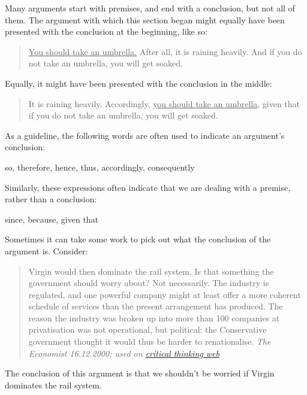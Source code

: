 Many arguments start with premises, and end with a conclusion, but not all of them. The argument with which this section began might equally have been presented with the conclusion at the beginning, like so:
	\begin{quote}
		\underline{You should take an umbrella.} After all, it is raining heavily. And if you do not take an umbrella, you will get soaked. 
	\end{quote}
Equally, it might have been presented with the conclusion in the middle:
	\begin{quote}
		It is raining heavily. Accordingly, \underline{you should take an umbrella}, given that if you do not take an umbrella, you will get soaked.
	\end{quote}

 As a guideline, the following words are often used to indicate an argument's conclusion:
	\begin{center}
		so, therefore, hence, thus, accordingly, consequently
	\end{center}
Similarly, these expressions often indicate that we are dealing with a premise, rather than a conclusion:
	\begin{center}
		since, because, given that
	\end{center}



Sometimes it can take some work to pick out what the conclusion of the argument is. 
Consider: 
\begin{quote}
Virgin would then dominate the rail system. Is that something the government should worry about? Not necessarily. The industry is regulated, and one powerful company might at least offer a more coherent schedule of services than the present arrangement has produced. The reason the industry was broken up into more than 100 companies at privatisation was not operational, but political: the Conservative government thought it would thus be harder to renationalise. \emph{The Economist 16.12.2000; used on \href{https://philosophy.hku.hk/think/arg/arg.php}{critical thinking web}}
\end{quote}
The conclusion of this argument is that we shouldn't be worried if Virgin dominates the rail system. 

